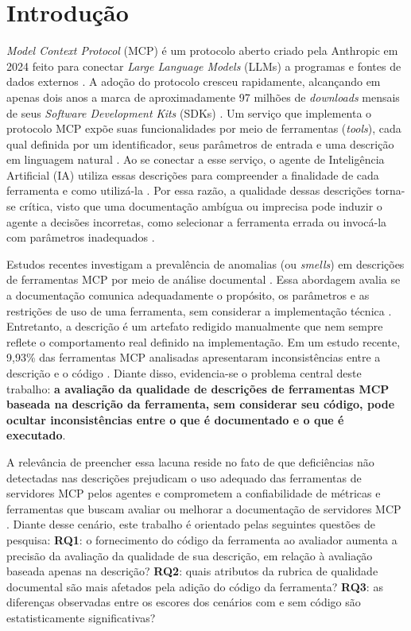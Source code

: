 \section{Introdução}
\label{sec:introducao}

\textit{Model Context Protocol} (MCP) é um protocolo aberto criado pela Anthropic em 2024 feito para conectar \textit{Large Language Models} (LLMs) a programas e fontes de dados externos \cite{mcpAtFirstGlance}. A adoção do protocolo cresceu rapidamente, alcançando em apenas dois anos a marca de aproximadamente 97 milhões de \textit{downloads} mensais de seus \textit{Software Development Kits} (SDKs) \cite{Avaya2026}. Um serviço que implementa o protocolo MCP expõe suas funcionalidades por meio de ferramentas (\textit{tools}), cada qual definida por um identificador, seus parâmetros de entrada e uma descrição em linguagem natural \cite{shi2026description, 2025arXiv250814704L}. Ao se conectar a esse serviço, o agente de Inteligência Artificial (IA) utiliza essas descrições para compreender a finalidade de cada ferramenta e como utilizá-la \cite{shi2026description}. Por essa razão, a qualidade dessas descrições torna-se crítica, visto que uma documentação ambígua ou imprecisa pode induzir o agente a decisões incorretas, como selecionar a ferramenta errada ou invocá-la com parâmetros inadequados \cite{2026arXiv260214878M}.

Estudos recentes investigam a prevalência de anomalias (ou \textit{smells}) em descrições de ferramentas MCP por meio de análise documental \cite{2026arXiv260214878M, guo2025measurement}. Essa abordagem avalia se a documentação comunica adequadamente o propósito, os parâmetros e as restrições de uso de uma ferramenta, sem considerar a implementação técnica \cite{mcpAtFirstGlance}. Entretanto, a descrição é um artefato redigido manualmente que nem sempre reflete o comportamento real definido na implementação. Em um estudo recente, 9,93\% das ferramentas MCP analisadas apresentaram inconsistências entre a descrição e o código \cite{shi2026description}. Diante disso, evidencia-se o problema central deste trabalho: \textbf{a avaliação da qualidade de descrições de ferramentas MCP baseada na descrição da ferramenta, sem considerar seu código, pode ocultar inconsistências entre o que é documentado e o que é executado}.

A relevância de preencher essa lacuna reside no fato de que deficiências não detectadas nas descrições prejudicam o uso adequado das ferramentas de servidores MCP pelos agentes \cite{2026arXiv260214878M} e comprometem a confiabilidade de métricas e ferramentas que buscam avaliar ou melhorar a documentação de servidores MCP \cite{shi2026description}. Diante desse cenário, este trabalho é orientado pelas seguintes questões de pesquisa: \textbf{RQ1}: o fornecimento do código da ferramenta ao avaliador aumenta a precisão da avaliação da qualidade de sua descrição, em relação à avaliação baseada apenas na descrição? \textbf{RQ2}: quais atributos da rubrica de qualidade documental são mais afetados pela adição do código da ferramenta? \textbf{RQ3}: as diferenças observadas entre os escores dos cenários com e sem código são estatisticamente significativas?

